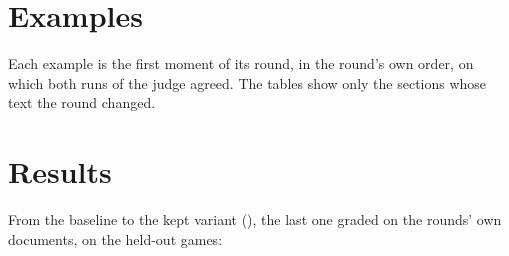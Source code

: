 \documentclass[11pt]{article}
\begin{document}
\begin{table}[!htbp]
\centering\footnotesize
\ControlsTable
\caption{The judge's controls, recomputed from their answers (\texttt{judge/controls/score.mjs}). In
round 9 the longer text is the old one, so its surviving the decoy means round 9's rejection
holds.}
\label{tab:controls}
\end{table}

\section{Examples}

Each example is the first moment of its round, in the round's own order, on which both runs of
the judge agreed. The tables show only the sections whose text the round changed.

\begin{figure}[!htbp]\ExampleA\caption{\ExampleACaption}\label{fig:exa}\end{figure}
\begin{figure}[!htbp]\ExampleB\caption{\ExampleBCaption}\label{fig:exb}\end{figure}
\begin{figure}[!htbp]\ExampleC\caption{\ExampleCCaption}\label{fig:exc}\end{figure}
\begin{figure}[!htbp]\ExampleD\caption{\ExampleDCaption}\label{fig:exd}\end{figure}
\begin{figure}[!htbp]\ExampleE\caption{\ExampleECaption}\label{fig:exe}\end{figure}
\begin{figure}[!htbp]\ExampleF\caption{\ExampleFCaption}\label{fig:exf}\end{figure}
\begin{figure}[!htbp]\ExampleG\caption{\ExampleGCaption}\label{fig:exg}\end{figure}
\begin{figure}[!htbp]\ExampleH\caption{\ExampleHCaption}\label{fig:exh}\end{figure}

\section{Results}
\label{sec:results}

From the baseline to the kept variant (\KeptVariant), the last one graded on the rounds' own
documents, on the held-out games:
\end{document}
